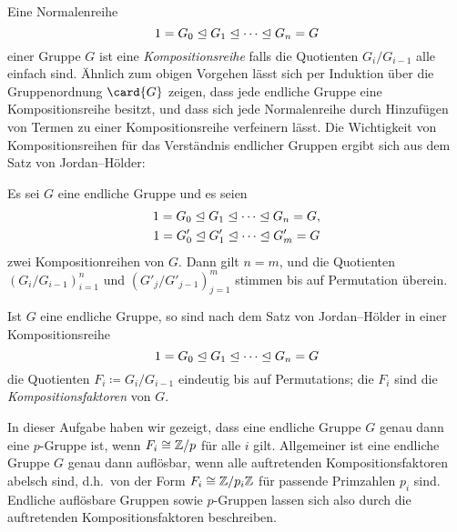 \begin{remark}
  Eine Normalenreihe
  \[
                1
    =           G_0
    \trianglelefteq  G_1
    \trianglelefteq  \dotsb
    \trianglelefteq  G_n
    =           G
  \]
  einer Gruppe $G$ ist eine \emph{Kompositionsreihe} falls die Quotienten $G_i/G_{i-1}$ alle einfach sind.
  Ähnlich zum obigen Vorgehen lässt sich per Induktion über die Gruppenordnung $\card{G}$ zeigen, dass jede endliche Gruppe eine Kompositionsreihe besitzt, und dass sich jede Normalenreihe durch Hinzufügen von Termen zu einer Kompositionsreihe verfeinern lässt.
  Die Wichtigkeit von Kompositionsreihen für das Verständnis endlicher Gruppen ergibt sich aus dem Satz von Jordan--Hölder:
  
  \begin{theorem}
    Es sei $G$ eine endliche Gruppe und es seien
    \begin{gather*}
                  1
      =           G_0
      \trianglelefteq  G_1
      \trianglelefteq  \dotsb
      \trianglelefteq  G_n
      =           G,
      \\
                  1
      =           G'_0
      \trianglelefteq  G'_1
      \trianglelefteq  \dotsb
      \trianglelefteq  G'_m
      =           G
    \end{gather*}
    zwei Kompositionreihen von $G$.
    Dann gilt $n = m$, und die Quotienten $(G_i/G_{i-1})_{i=1}^n$ und $(G'_j/G'_{j-1})_{j=1}^m$ stimmen bis auf Permutation überein.
  \end{theorem}
  
  Ist $G$ eine endliche Gruppe, so sind nach dem Satz von Jordan--Hölder in einer Kompositionsreihe
  \[
                1
    =           G_0
    \trianglelefteq  G_1
    \trianglelefteq  \dotsb
    \trianglelefteq  G_n
    =           G
  \]
  die Quotienten $F_i \coloneqq G_i/G_{i-1}$ eindeutig bis auf Permutations;
  die $F_i$ sind die \emph{Kompositionsfaktoren} von $G$.
  
  In dieser Aufgabe haben wir gezeigt, dass eine endliche Gruppe $G$ genau dann eine $p$-Gruppe ist, wenn $F_i \cong \mathbb{Z}/p$ für alle $i$ gilt.
  Allgemeiner ist eine endliche Gruppe $G$ genau dann auflösbar, wenn alle auftretenden Kompositionsfaktoren abelsch sind, d.h.\ von der Form $F_i \cong \mathbb{Z}/p_i\mathbb{Z}$ für passende Primzahlen $p_i$ sind.
  Endliche auflösbare Gruppen sowie $p$-Gruppen lassen sich also durch die auftretenden Kompositionsfaktoren beschreiben.
\end{remark}





